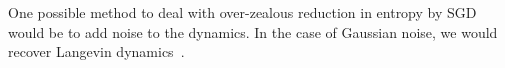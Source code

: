 \documentclass{article} %
\begin{document}
One possible method to deal with over-zealous reduction in entropy by SGD would be to add noise to the dynamics.
In the case of Gaussian noise, we would recover Langevin dynamics~\citep{neal2011mcmc}.







\end{document}
